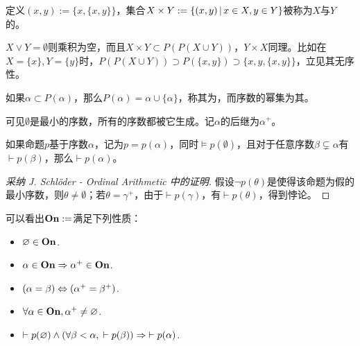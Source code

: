 \begin{definition}[Cartesian积]
	
	定义$(x,y) := \{x,\{x,y\}\}$，集合$X\times Y := \{(x,y)\,\vert\, x\in X, y\in Y\}$被称为$X$与$Y$的。
	
\end{definition}

$X\vee Y=\emptyset$则乘积为空，而且$X\times Y\subset P(P(X\cup Y))$，$Y\times X$同理。比如在$X=\{x\},Y=\{y\}$时，$ P(P(X\cup Y)) \supset P(\{x,y\}) \supset \{x,y,\{x,y\}\} $，立见其无序性。

\begin{theorem}[序数的后继]
	
	如果$\alpha\subset P(\alpha)$，那么$P(\alpha) = \alpha \cup \{\alpha\}$，称其为，而序数的幂集为其。
	
\end{theorem}

可见$\emptyset$是最小的序数，所有的序数都被它生成。记$\alpha$的后继为$\alpha^+$。

\begin{proposition}[归纳法]
	
	如果命题$p$基于序数$\alpha$，记为$p=p(\alpha)$，同时$\vDash p(\emptyset)$，且对于任意序数$\beta \subsetneq \alpha$有$\vdash p(\beta)$，那么$\vdash p(\alpha)$。
	
	\begin{proof}[采纳 J. Schl\"{o}der - Ordinal Arithmetic 中的证明]
		
		假设$\neg p(\theta)$是使得该命题为假的最小序数，则$\theta \neq \emptyset$；若$\theta = \gamma^+$，由于$\vdash p(\gamma)$，有$\vdash p(\theta)$，得到悖论。
		
	\end{proof}
	
\end{proposition}

\begin{theorem}[Peano公理]
	
	可以看出$\mathbf{On} := $满足下列性质：
	
	\begin{itemize}
		
		\item $ \varnothing \in \mathbf{On} $.
		
		\item $ \alpha \in \mathbf{On} \Rightarrow \alpha^+ \in \mathbf{On} $.
		
		\item $ ( \alpha = \beta ) \Leftrightarrow ( \alpha^+ = \beta^+ ) $.
		
		\item $ \forall \alpha \in \mathbf{On}, \alpha^+ \neq \varnothing $.
		
		\item $ \vdash p(\varnothing) \wedge ( \forall \beta < \alpha, \; \vdash p(\beta) ) \Rightarrow \; \vdash p(\alpha) $.
		
	\end{itemize}

\end{theorem}

